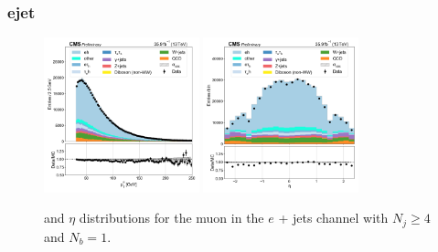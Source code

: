 
\subsubsection{ejet}


\begin{figure}[htb!]
    \centering
    \includegraphics[width=0.4\textwidth]{chapters/Appendix/sectionPlots/figures/data_mc_overlays/ejet_2016_cat_gt4_eq1_signal_linear_lepton_lepton1_pt}
    \includegraphics[width=0.4\textwidth]{chapters/Appendix/sectionPlots/figures/data_mc_overlays/ejet_2016_cat_gt4_eq1_signal_linear_lepton_lepton1_eta}
    \caption{\pt and $\eta$ distributions for the muon in the $e$ + jets
    channel with $N_{j} \geq 4$ and $N_{b} = 1$.
    \label{fig:ejet_1_kinematic}}
\end{figure}

